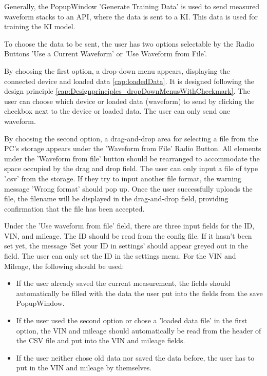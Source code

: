 \documentclass{scrreprt}
\begin{document}
Generally, the PopupWindow 'Generate Training Data' is used to send measured waveform stacks to an API, where the data is sent to a KI. This data is used for training the KI model.

To choose the data to be sent, the user has two options selectable by the Radio Buttons 'Use a Current Waveform' or 'Use Waveform from File'.

By choosing the first option, a drop-down menu appears, displaying the connected device and loaded data \ref{cap:loadedData}. It is designed following the design principle \ref{cap:Designprinciples_dropDownMenusWithCheckmark}. 
The user can choose which device or loaded data (waveform) to send by clicking the checkbox next to the device or loaded data. The user can only send one waveform.

By choosing the second option, a drag-and-drop area for selecting a file from the PC's storage appears under the 'Waveform from File' Radio Button. 
All elements under the 'Waveform from file' button should be rearranged to accommodate the space occupied by the drag and drop field. 
The user can only input a file of type '.csv' from the storage. If they try to input another file format, the warning message 'Wrong format' should pop up. 
Once the user successfully uploads the file, the filename will be displayed in the drag-and-drop field, providing confirmation that the file has been accepted.

Under the 'Use waveform from file' field, there are three input fields for the ID, VIN, and mileage. The ID should be read from the config file. 
If it hasn't been set yet, the message 'Set your ID in settings' should appear greyed out in the field. The user can only set the ID in the settings menu. For the VIN and Mileage, the following should be used:
\begin{itemize}
    \item If the user already saved the current measurement, the fields should automatically be filled with the data the user put into the fields from the save PopupWindow.
    \item If the user used the second option or chose a 'loaded data file' in the first option, the VIN and mileage should automatically be read from the header of the CSV file and put into the VIN and mileage fields.
    \item If the user neither chose old data nor saved the data before, the user has to put in the VIN and mileage by themselves.
\end{itemize}
\end{document}
